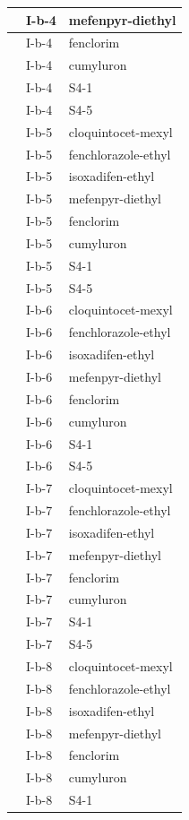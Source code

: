 \documentclass[11pt,a4paper]{article}
\begin{document}
\begin{table}[h]
\begin{tabular}{|l|l|l|}
 & I-b-4 & mefenpyr-diethyl \\ \hline
 & I-b-4 & fenclorim \\ \hline
 & I-b-4 & cumyluron \\ \hline
 & I-b-4 & S4-1 \\ \hline
 & I-b-4 & S4-5 \\ \hline
 & I-b-5 & cloquintocet-mexyl \\ \hline
 & I-b-5 & fenchlorazole-ethyl \\ \hline
 & I-b-5 & isoxadifen-ethyl \\ \hline
 & I-b-5 & mefenpyr-diethyl \\ \hline
 & I-b-5 & fenclorim \\ \hline
 & I-b-5 & cumyluron \\ \hline
 & I-b-5 & S4-1 \\ \hline
 & I-b-5 & S4-5 \\ \hline
 & I-b-6 & cloquintocet-mexyl \\ \hline
 & I-b-6 & fenchlorazole-ethyl \\ \hline
 & I-b-6 & isoxadifen-ethyl \\ \hline
 & I-b-6 & mefenpyr-diethyl \\ \hline
 & I-b-6 & fenclorim \\ \hline
 & I-b-6 & cumyluron \\ \hline
 & I-b-6 & S4-1 \\ \hline
 & I-b-6 & S4-5 \\ \hline
 & I-b-7 & cloquintocet-mexyl \\ \hline
 & I-b-7 & fenchlorazole-ethyl \\ \hline
 & I-b-7 & isoxadifen-ethyl \\ \hline
 & I-b-7 & mefenpyr-diethyl \\ \hline
 & I-b-7 & fenclorim \\ \hline
 & I-b-7 & cumyluron \\ \hline
 & I-b-7 & S4-1 \\ \hline
 & I-b-7 & S4-5 \\ \hline
 & I-b-8 & cloquintocet-mexyl \\ \hline
 & I-b-8 & fenchlorazole-ethyl \\ \hline
 & I-b-8 & isoxadifen-ethyl \\ \hline
 & I-b-8 & mefenpyr-diethyl \\ \hline
 & I-b-8 & fenclorim \\ \hline
 & I-b-8 & cumyluron \\ \hline
 & I-b-8 & S4-1 \\ \hline

\end{tabular}
\end{table}
\end{document}
